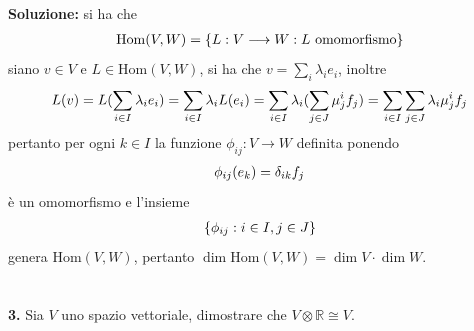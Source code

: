 \documentclass{article}
\begin{document}
\textbf{Soluzione:} si ha che
\begin{gather}
    \mathrm{Hom}(V, W) = \{ L : V \longrightarrow W : L \text{ omomorfismo} \} \notag
\end{gather}
siano $v \in V$ e $L \in \mathrm{Hom}(V, W)$, si ha che $v = \sum_i \lambda_i e_i$, inoltre
\begin{gather}
    L(v) = L( \sum_{i \in I} \lambda_i e_i) = \sum_{i \in I} \lambda_i L(e_i) = \sum_{i \in I} \lambda_i ( \sum_{j \in J} \mu^i_j f_j) = \sum_{i \in I} \sum_{j \in J} \lambda_i \mu^i_j f_j  \notag
\end{gather}
pertanto per ogni $k \in I$ la funzione $\phi_{ij} : V \longrightarrow W$ definita ponendo
\begin{gather}
    \phi_{ij}(e_k) = \delta_{ik}f_j \notag
\end{gather}
è un omomorfismo e l'insieme
\begin{gather}
    \{ \phi_{ij} : i \in I, j \in J \} \notag
\end{gather}
genera $\mathrm{Hom}(V, W)$, pertanto $\dim \mathrm{Hom}(V, W) = \dim V \cdot \dim W$. \\ \\ \\
\textbf{3.} Sia $V$ uno spazio vettoriale, dimostrare che $V \otimes \mathbb{R} \cong V$. \\
\end{document}
